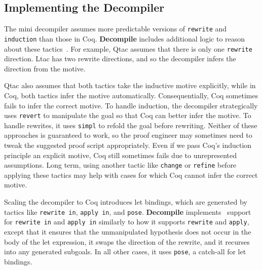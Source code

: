 \subsection{Implementing the Decompiler}
\label{sec:second}

The mini decompiler assumes more predictable versions of \lstinline{rewrite} and \lstinline{induction}
than those in Coq. \textbf{Decompile} includes additional logic to reason about these tactics~\href{https://github.com/uwplse/pumpkin-pi/blob/silent/plugin/src/coq-plugin-lib/src/coq/decompiler/decompiler.ml}{}. %
For example, Qtac assumes that there is only one \lstinline{rewrite} direction. Ltac has two rewrite directions,
and so the decompiler infers the direction from the motive.

Qtac also assumes that both tactics take the inductive motive explicitly,
while in Coq, both tactics infer the motive automatically.
Consequentially, Coq sometimes fails to infer the correct motive.
To handle induction, the decompiler strategically uses \lstinline{revert} to manipulate the goal
so that Coq can better infer the motive.
To handle rewrites, it uses \lstinline{simpl} to refold the goal before rewriting.
Neither of these approaches is guaranteed to work, so the proof engineer may sometimes need to tweak the suggested proof script appropriately.
Even if we pass Coq's induction principle an explicit motive, Coq still sometimes fails due
to unrepresented assumptions.
Long term, using another tactic like \lstinline{change} or \lstinline{refine} before applying these tactics
may help with cases for which Coq cannot infer the correct motive.

Scaling the decompiler to Coq introduces let bindings, which are generated by 
tactics like \lstinline{rewrite in}, \lstinline{apply in}, and \lstinline{pose}.
\textbf{Decompile} implements~\href{https://github.com/uwplse/pumpkin-pi/blob/silent/plugin/src/coq-plugin-lib/src/coq/decompiler/decompiler.ml}{} %
support for \lstinline{rewrite in} and \lstinline{apply in} similarly to how it supports
\lstinline{rewrite} and \lstinline{apply}, except that it ensures that the unmanipulated hypothesis does not occur in the body of the let expression,
it swaps the direction of the rewrite, and it recurses into any generated subgoals.
In all other cases, it uses \lstinline{pose}, a catch-all for let bindings.

